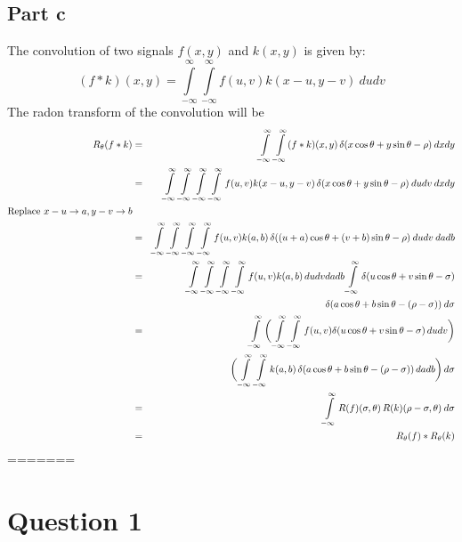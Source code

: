 \documentclass[12pt]{article}
\begin{document}
\subsection*{Part c}
The convolution of two signals $f(x, y)$ and $k(x, y)$ is given by:
$$(f * k)(x, y) = \int \limits_{-\infty}^\infty \int \limits_{-\infty}^\infty f(u, v) k(x-u, y-v)\: dudv$$
The radon transform of the convolution will be
\begin{eqnarray*}
R_\theta(f*k) &=& \int \limits_{-\infty}^\infty \int \limits_{-\infty}^ \infty (f*k)(x, y)\, \delta(x \cos \theta + y \sin \theta - \rho)\: dxdy\\
&=& \int \limits_{-\infty}^\infty \int \limits_{-\infty}^ \infty \int \limits_{-\infty}^\infty \int \limits_{-\infty}^ \infty f(u, v) k(x-u, y-v)\, \delta(x \cos \theta + y \sin \theta - \rho)\: dudv\: dxdy\\
\text{Replace } x-u \rightarrow a, y-v \rightarrow b&&\\
&=& \int \limits_{-\infty}^\infty \int \limits_{-\infty}^ \infty \int \limits_{-\infty}^\infty \int \limits_{-\infty}^ \infty  f(u, v) k(a, b) \, \delta((u+a)\cos\theta + (v+b)\sin \theta - \rho)\: dudv\: dadb\\
&=& \int \limits_{-\infty}^\infty \int \limits_{-\infty}^ \infty \int \limits_{-\infty}^\infty \int \limits_{-\infty}^ \infty f(u, v) k(a, b) \, dudvdadb \int \limits_{-\infty}^\infty \delta(u\cos\theta + v\sin\theta - \sigma)\\
&&\hskip 12em\delta(a\cos\theta + b\sin\theta - (\rho-\sigma))\: d\sigma\\
&=& \int \limits_{-\infty}^\infty \bigg(\int \limits_{-\infty}^\infty\int \limits_{-\infty}^\infty f(u,v) \delta(u\cos\theta + v\sin\theta - \sigma)\, dudv\bigg)\\
&&\bigg(\int \limits_{-\infty}^\infty\int \limits_{-\infty}^\infty k(a, b)\,\delta(a\cos\theta + b\sin\theta - (\rho-\sigma))\,dadb \bigg)\, d\sigma\\
&=&  \int \limits_{-\infty}^\infty R(f)(\sigma, \theta) \, R(k)(\rho - \sigma, \theta)\: d\sigma\\
&=& R_\theta(f) * R_\theta(k)
\end{eqnarray*}
=======
\section*{Question 1}
\end{document}
